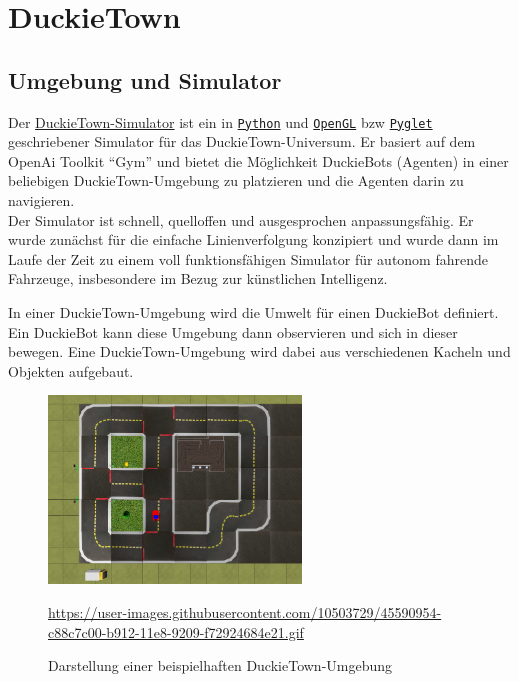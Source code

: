 \chapter{DuckieTown}

\section{Umgebung und Simulator}


Der \href{https://github.com/duckietown/gym-duckietown}{DuckieTown-Simulator} ist ein in \href{https://www.python.org/}{\texttt{Python}} und \href{https://www.opengl.org/}{\texttt{OpenGL}} \acf{bzw} \href{http://pyglet.org/}{\texttt{Pyglet}} geschriebener Simulator für das \glqq DuckieTown-Universum\grqq. Er basiert auf dem OpenAi Toolkit ``Gym'' \cite{gym} und bietet die Möglichkeit DuckieBots (Agenten) in einer beliebigen DuckieTown-Umgebung zu platzieren und die Agenten darin zu navigieren. \cite{gym_duckietown} \\

Der Simulator ist schnell, quelloffen und ausgesprochen anpassungsfähig. Er wurde zunächst für die einfache Linienverfolgung konzipiert und wurde dann im Laufe der Zeit zu einem voll funktionsfähigen Simulator für autonom fahrende Fahrzeuge, insbesondere im Bezug zur künstlichen Intelligenz. \cite{gym_duckietown}

In einer DuckieTown-Umgebung wird die Umwelt für einen DuckieBot definiert. Ein DuckieBot kann diese Umgebung dann observieren und sich in dieser bewegen. Eine DuckieTown-Umgebung wird dabei aus verschiedenen Kacheln und Objekten aufgebaut. 

\begin{figure}[H]
	\centering
	\includegraphics[width=0.6\textwidth]{kapitel2/images/duckietown-umgebung.png}
	\label{fig:duckietown-umgebung}
	\caption{Darstellung einer beispielhaften DuckieTown-Umgebung}
	\vspace{0.2cm}
	\quelle\url{https://user-images.githubusercontent.com/10503729/45590954-c88c7c00-b912-11e8-9209-f72924684e21.gif}
\end{figure}

